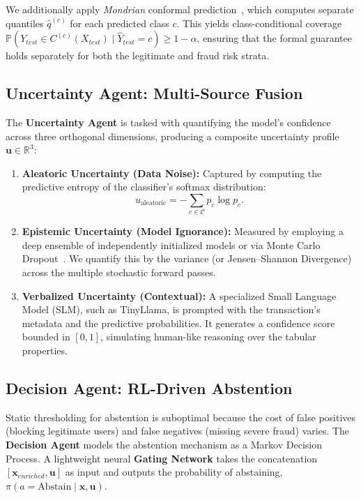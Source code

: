 \documentclass[12pt,a4paper]{article}
\begin{document}
We additionally apply \textit{Mondrian} conformal prediction~\cite{b34}, which
computes separate quantiles $\hat{q}^{(c)}$ for each predicted class $c$. This
yields class-conditional coverage $\mathbb{P}(Y_{test}\in C^{(c)}(X_{test})\mid
\hat{Y}_{test}=c)\geq 1-\alpha$, ensuring that the formal guarantee holds
separately for both the legitimate and fraud risk strata.

\subsection{Uncertainty Agent: Multi-Source Fusion}

The \textbf{Uncertainty Agent} is tasked with quantifying the model's confidence
across three orthogonal dimensions, producing a composite uncertainty profile
$\mathbf{u}\in\mathbb{R}^{3}$:

\begin{enumerate}
  \item \textbf{Aleatoric Uncertainty (Data Noise):} Captured by computing the
        predictive entropy of the classifier's softmax distribution:
        \begin{equation}
          u_{\text{aleatoric}} = -\sum_{c\in\mathcal{C}} p_c\log p_c.
          \label{eq:aleatoric}
        \end{equation}

  \item \textbf{Epistemic Uncertainty (Model Ignorance):} Measured by employing
        a deep ensemble of independently initialized models or via Monte Carlo
        Dropout~\cite{b7}. We quantify this by the variance (or
        Jensen--Shannon Divergence) across the multiple stochastic forward
        passes.

  \item \textbf{Verbalized Uncertainty (Contextual):} A specialized Small
        Language Model (SLM), such as TinyLlama, is prompted with the
        transaction's metadata and the predictive probabilities. It generates a
        confidence score bounded in $[0,1]$, simulating human-like reasoning
        over the tabular properties.
\end{enumerate}

\subsection{Decision Agent: RL-Driven Abstention}

Static thresholding for abstention is suboptimal because the cost of false
positives (blocking legitimate users) and false negatives (missing severe fraud)
varies. The \textbf{Decision Agent} models the abstention mechanism as a Markov
Decision Process. A lightweight neural \textbf{Gating Network} takes the
concatenation $[\mathbf{x}_{enriched},\mathbf{u}]$ as input and outputs the
probability of abstaining, $\pi(a=\text{Abstain}\mid\mathbf{x},\mathbf{u})$.
\end{document}
